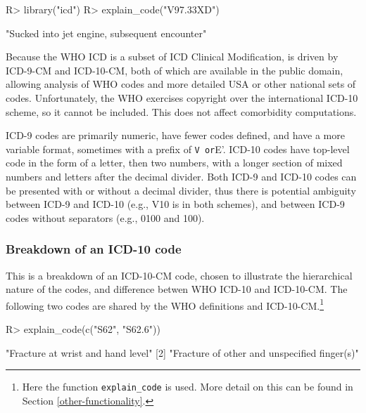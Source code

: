 \documentclass[article]{jss}
\begin{document}
\begin{CodeChunk}

\begin{CodeInput}
R> library("icd")
R> explain_code("V97.33XD")
\end{CodeInput}

\begin{CodeOutput}
[1] "Sucked into jet engine, subsequent encounter"
\end{CodeOutput}
\end{CodeChunk}

Because the WHO ICD is a subset of ICD Clinical Modification, 
is driven by ICD-9-CM and ICD-10-CM, both of which are available in the
public domain, allowing analysis of WHO codes and more detailed USA or
other national sets of codes. Unfortunately, the WHO exercises copyright
over the international ICD-10 scheme, so it cannot be included. This
does not affect comorbidity computations.

ICD-9 codes are primarily numeric, have fewer codes defined, and have a
more variable format, sometimes with a prefix of
\texttt{V\textquotesingle{}\ or}E'. ICD-10 codes have top-level code in
the form of a letter, then two numbers, with a longer section of mixed
numbers and letters after the decimal divider. Both ICD-9 and ICD-10
codes can be presented with or without a decimal divider, thus there is
potential ambiguity between ICD-9 and ICD-10 (e.g., V10 is in both
schemes), and between ICD-9 codes without separators (e.g., 0100 and
100).

\subsubsection{Breakdown of an ICD-10
code}\label{breakdown-of-an-icd-10-code}

This is a breakdown of an ICD-10-CM code, chosen to illustrate the
hierarchical nature of the codes, and difference betwen WHO ICD-10 and
ICD-10-CM. The following two codes are shared by the WHO definitions and
ICD-10-CM.\footnote{Here the  function \texttt{explain\_code}
  is used. More detail on this can be found in Section
  \ref{other-functionality}.}

\begin{CodeChunk}

\begin{CodeInput}
R> explain_code(c("S62", "S62.6"))
\end{CodeInput}

\begin{CodeOutput}
[1] "Fracture at wrist and hand level"           
[2] "Fracture of other and unspecified finger(s)"
\end{CodeOutput}
\end{CodeChunk}
\end{document}
